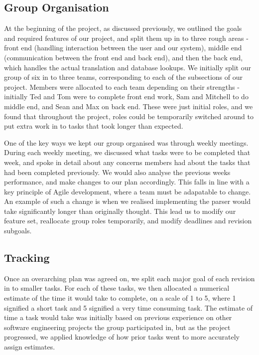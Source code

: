 \documentclass[a4wide, 11pt]{article}
\begin{document}
\subsection{Group Organisation}

At the beginning of the project, as discussed previously, we outlined the goals
and required features of our project, and split them up in to three rough areas
- front end (handling interaction between the user and our system), middle end
(communication between the front end and back end), and then the back end,
which handles the actual translation and database lookups. We initially split
our group of six in to three teams, corresponding to each of the subsections of
our project. Members were allocated to each team depending on their strengths -
initially Ted and Tom were to complete front end work, Sam and Mitchell to do
middle end, and Sean and Max on back end. These were just initial roles, and we
found that throughout the project, roles could be temporarily switched around
to put extra work in to tasks that took longer than expected.

One of the key ways we kept our group organised was through weekly meetings.
During each weekly meeting, we discussed what tasks were to be completed that
week, and spoke in detail about any concerns members had about the tasks that
had been completed previously. We would also analyse the previous weeks
performance, and make changes to our plan accordingly. This falls in line with 
a key principle of Agile development, where a team must be adapatable to
change. An example of such a change is when we realised implementing the parser
would take significantly longer than originally thought. This lead us to modify 
our feature set, reallocate group roles temporarily, and modify deadlines 
and revision subgoals.


\subsection{Tracking}

Once an overarching plan was agreed on, we split each major goal of each
revision in to smaller tasks. For each of these tasks, we then allocated a
numerical estimate of the time it would take to complete, on a scale of 1 to 5,
where 1 signified a short task and 5 signified a very time consuming task. The
estimate of time a task would take was initially based on previous experience
on other software engineering projects the group participated in, but as the
project progressed, we applied knowledge of how prior tasks went to more
accurately assign estimates.
\end{document}
